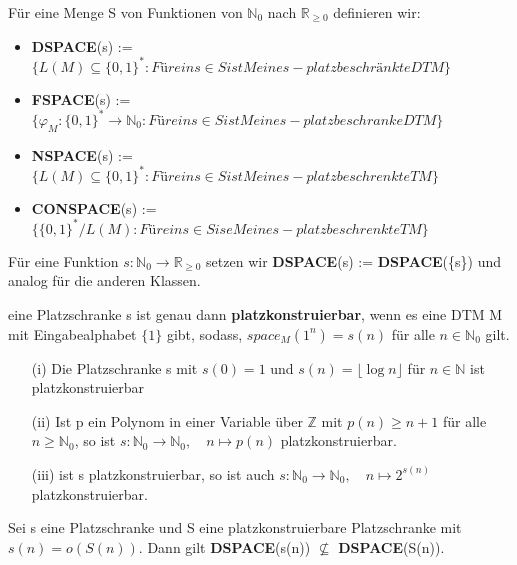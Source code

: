     Für eine Menge S von Funktionen von \(\mathbb{N}_0\) nach \(\mathbb{R}_{\geq 0}\) definieren wir:
    \begin{itemize}
        \item \textbf{DSPACE}(s) := \(\{L(M) \subseteq \{0, 1\}^* : Für ein s \in S ist M eine s-platzbeschränkte DTM\}\)
        \item \textbf{FSPACE}(s) := \(\{\varphi_M : \{0, 1\}^* \to \mathbb{N}_0 : Für ein s \in S ist M eine s-platzbeschranke DTM\}\)
        \item \textbf{NSPACE}(s) := \(\{L(M) \subseteq \{0, 1\}^* : Für ein s \in S ist M eine s-platzbeschrenkte TM\}\)
        \item \textbf{CONSPACE}(s) := \(\{\{0, 1\}^* / L(M) : Für ein s \in S ise M eine s-platzbeschrenkte TM\}\)
    \end{itemize}
    Für eine Funktion \(s : \mathbb{N}_0 \to \mathbb{R}_{\geq 0}\) setzen wir \textbf{DSPACE}(s) := \textbf{DSPACE}(\{s\}) und analog für die anderen Klassen.

    eine Platzschranke s ist genau dann \textbf{platzkonstruierbar}, wenn es eine DTM M mit Eingabealphabet \(\{1\}\) gibt, sodass, \(space_M(1^n) = s(n)\) für alle \(n \in \mathbb{N}_0\) gilt.

    \begin{itemize}
        \item [(i)] Die Platzschranke s mit \(s(0) = 1\) und \(s(n) = \lfloor \log n\rfloor \) für \(n \in \mathbb{N}\) ist platzkonstruierbar 
        \item [(ii)] Ist p ein Polynom in einer Variable über \(\mathbb{Z}\) mit \(p(n) \geq n +1\) für alle \(n \geq \mathbb{N}_0\), so ist \(s : \mathbb{N}_0 \to \mathbb{N}_0, \quad n \mapsto p(n)\) platzkonstruierbar.
        \item [(iii)] ist s platzkonstruierbar, so ist auch \(s: \mathbb{N}_0 \to \mathbb{N}_0, \quad n \mapsto 2^{s(n)}\) platzkonstruierbar.
    \end{itemize}

    Sei s eine Platzschranke und S eine platzkonstruierbare Platzschranke mit \(s(n) = o(S(n))\). Dann gilt \textbf{DSPACE}(s(n)) \(\not \subseteq\) \textbf{DSPACE}(S(n)).

